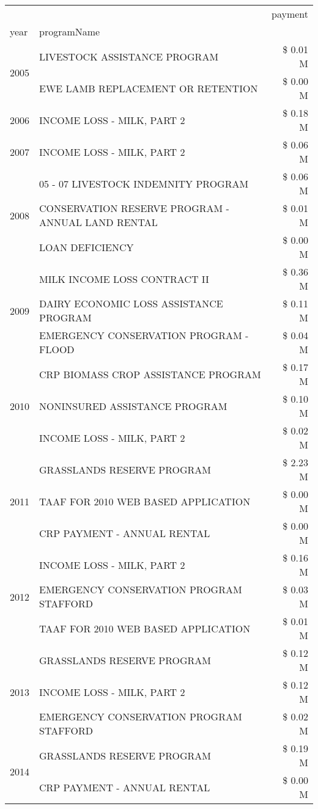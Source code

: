 \begin{tabular}{llr}
\toprule
 &  & payment \\
year & programName &  \\
\midrule
\multirow[t]{2}{*}{2005} & LIVESTOCK ASSISTANCE PROGRAM & \$ 0.01 M \\
 & EWE LAMB REPLACEMENT OR RETENTION & \$ 0.00 M \\
\cline{1-3}
2006 & INCOME LOSS - MILK, PART 2 & \$ 0.18 M \\
\cline{1-3}
2007 & INCOME LOSS - MILK, PART 2 & \$ 0.06 M \\
\cline{1-3}
\multirow[t]{3}{*}{2008} & 05 - 07 LIVESTOCK INDEMNITY PROGRAM & \$ 0.06 M \\
 & CONSERVATION RESERVE PROGRAM - ANNUAL LAND RENTAL & \$ 0.01 M \\
 & LOAN DEFICIENCY & \$ 0.00 M \\
\cline{1-3}
\multirow[t]{3}{*}{2009} & MILK INCOME LOSS CONTRACT II & \$ 0.36 M \\
 & DAIRY ECONOMIC LOSS ASSISTANCE PROGRAM & \$ 0.11 M \\
 & EMERGENCY CONSERVATION PROGRAM - FLOOD & \$ 0.04 M \\
\cline{1-3}
\multirow[t]{3}{*}{2010} & CRP BIOMASS CROP ASSISTANCE PROGRAM & \$ 0.17 M \\
 & NONINSURED ASSISTANCE PROGRAM & \$ 0.10 M \\
 & INCOME LOSS - MILK, PART 2 & \$ 0.02 M \\
\cline{1-3}
\multirow[t]{3}{*}{2011} & GRASSLANDS RESERVE PROGRAM & \$ 2.23 M \\
 & TAAF FOR 2010 WEB BASED APPLICATION & \$ 0.00 M \\
 & CRP PAYMENT - ANNUAL RENTAL & \$ 0.00 M \\
\cline{1-3}
\multirow[t]{3}{*}{2012} & INCOME LOSS - MILK, PART 2 & \$ 0.16 M \\
 & EMERGENCY CONSERVATION PROGRAM STAFFORD & \$ 0.03 M \\
 & TAAF FOR 2010 WEB BASED APPLICATION & \$ 0.01 M \\
\cline{1-3}
\multirow[t]{3}{*}{2013} & GRASSLANDS RESERVE PROGRAM & \$ 0.12 M \\
 & INCOME LOSS - MILK, PART 2 & \$ 0.12 M \\
 & EMERGENCY CONSERVATION PROGRAM STAFFORD & \$ 0.02 M \\
\cline{1-3}
\multirow[t]{2}{*}{2014} & GRASSLANDS RESERVE PROGRAM & \$ 0.19 M \\
 & CRP PAYMENT - ANNUAL RENTAL & \$ 0.00 M \\

\end{tabular}
